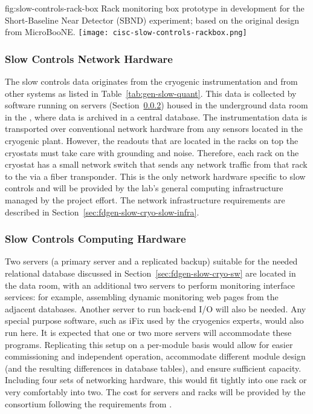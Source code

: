 \begin{dunefigure}{fig:slow-controls-rack-box}
{Rack monitoring box prototype in development for the Short-Baseline Near Detector (SBND) experiment; based on the original design from MicroBooNE.}
\texttt{[image: cisc-slow-controls-rackbox.png]}
\end{dunefigure}


\subsubsection{Slow Controls Network Hardware}
\label{sec:fdgen-slow-cryo-slow-network}
The slow controls data originates from the cryogenic instrumentation and from other systems as listed in Table~\ref{tab:gen-slow-quant}. This data is collected by software running on servers
(Section~\ref{sec:fdgen-slow-cryo-slow-compute})
housed in the underground data room in the ,
where data is archived in a central  database.
The instrumentation data is transported over
conventional network hardware from any sensors located in the cryogenic
plant.  However, the readouts that are located in the racks on top the
cryostats must take care with grounding and noise.  Therefore, each
rack on the cryostat has a small network switch that sends
any network traffic from that rack to the  via a fiber transponder.
This is the only network hardware specific to slow controls and will be provided by the lab's general computing infrastructure managed by the project  effort. The network infrastructure requirements are described in
Section~\ref{sec:fdgen-slow-cryo-slow-infra}.

\subsubsection{Slow Controls Computing Hardware}
\label{sec:fdgen-slow-cryo-slow-compute}
Two servers (a primary server and a replicated backup) suitable for the needed relational database discussed
in Section~\ref{sec:fdgen-slow-cryo-sw} are located in the  data
room, with an additional
two servers to perform  monitoring interface services: for
example, assembling dynamic  monitoring web pages from the adjacent
databases.  Another server to run back-end I/O will also be needed.  Any special purpose software, such as iFix used by the cryogenics experts, would
also run here. It is expected that one or two more servers will accommodate these programs.
Replicating this setup on a per-module basis would allow for easier
commissioning and independent operation, accommodate different module
design (and the resulting differences in database tables), and ensure
sufficient capacity.  Including four sets of networking hardware, this
would fit tightly into one rack or very comfortably into two. The cost for servers and racks will be provided by the  consortium following the requirements from . 

